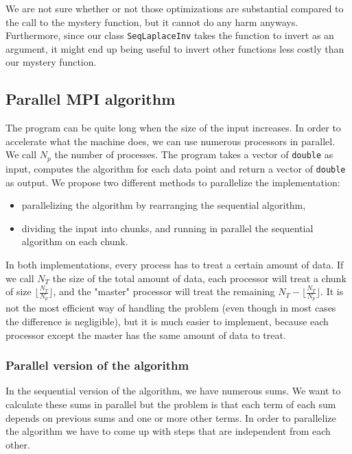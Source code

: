 \documentclass[11pt,a4paper]{article}
\begin{document}
We are not sure whether or not those optimizations are substantial compared to the call to the mystery function, but it cannot do any harm anyways. Furthermore, since our class \verb_SeqLaplaceInv_ takes the function to invert as an argument, it might end up being useful to invert other functions less costly than our mystery function.

\subsection{Parallel MPI algorithm}

The program can be quite long when the size of the input increases. In order to accelerate what the machine does, we can use numerous processors in parallel. We call $N_p$ the number of processes. The program takes a vector of \verb_double_ as input, computes the algorithm for each data point and return a vector of \verb_double_ as output. We propose two different methods to parallelize the implementation:

\begin{itemize}

\item parallelizing the algorithm by rearranging the sequential algorithm,

\item dividing the input into chunks, and running in parallel the sequential algorithm on each chunk.

\end{itemize}

In both implementations, every process has to treat a certain amount of data. If we call $N_T$ the size of the total amount of data, each processor will treat a chunk of size $\lfloor \frac{N_T}{N_p} \rfloor$, and the "master" processor will treat the remaining $N_T-\lfloor \frac{N_T}{N_p} \rfloor$. It is not the most efficient way of handling the problem (even though in most cases the difference is negligible), but it is much easier to implement, because each processor except the master has the same amount of data to treat. 

\subsubsection{Parallel version of the algorithm}

In the sequential version of the algorithm, we have numerous sums. We want to calculate these sums in parallel but the problem is that each term of each sum depends on previous sums and one or more other terms. In order to parallelize the algorithm we have to come up with steps that are independent from each other.
\end{document}
